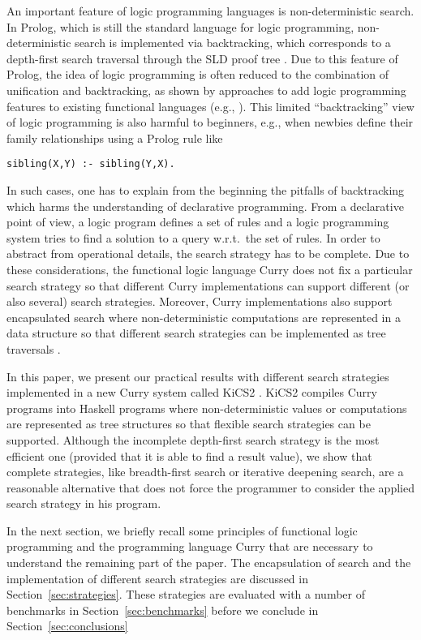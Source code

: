 \documentclass[english]{lni}
\begin{document}
An important feature of logic programming languages
is non-deterministic search.
In Prolog, which is still the standard language for logic programming,
non-deterministic search is implemented via backtracking,
which corresponds to a depth-first search traversal
through the SLD proof tree \cite{Lloyd87}.
Due to this feature of Prolog,
the idea of logic programming is often reduced to
the combination of unification and backtracking,
as shown by approaches to add logic programming features
to existing functional languages
(e.g., \cite{ClaessenLjungloef00,Hinze01}).
This limited ``backtracking'' view of logic programming
is also harmful to beginners, e.g., when newbies
define their family relationships using a Prolog rule like
\begin{lstlisting}
sibling(X,Y) :- sibling(Y,X).
\end{lstlisting}
In such cases, one has to explain from the beginning
the pitfalls of backtracking which harms the understanding
of declarative programming.
From a declarative point of view,
a logic program defines a set of rules
and a logic programming system tries to find
a solution to a query w.r.t.\ the set of rules.
In order to abstract from operational details,
the search strategy has to be complete.
Due to these considerations,
the functional logic language Curry \cite{Hanus06Curry}
does not fix a particular search strategy
so that different Curry implementations can support
different (or also several) search strategies.
Moreover, Curry implementations also
support encapsulated search
where non-deterministic computations are represented
in a data structure so that different search strategies
can be implemented as tree traversals
\cite{BrasselHanusHuch04JFLP,HanusSteiner98PLILP,Lux99FLOPS}.

In this paper, we present our practical results
with different search strategies implemented
in a new Curry system called
KiCS2 \cite{BrasselHanusPeemoellerReck11}.
KiCS2 compiles Curry programs into Haskell programs
where non-deterministic values or computations are represented
as tree structures so that flexible search strategies
can be supported.
Although the incomplete depth-first search strategy
is the most efficient one (provided that it is able
to find a result value),
we show that complete strategies,
like breadth-first search or iterative deepening search,
are a reasonable alternative that does not force
the programmer to consider the applied search strategy
in his program.

In the next section, we briefly recall some principles
of functional logic programming and the programming language Curry
that are necessary to understand the remaining part of the paper.
The encapsulation of search and the implementation of different
search strategies are discussed in Section~\ref{sec:strategies}.
These strategies are evaluated with a number of benchmarks
in Section~\ref{sec:benchmarks}
before we conclude in Section~\ref{sec:conclusions}
\end{document}
